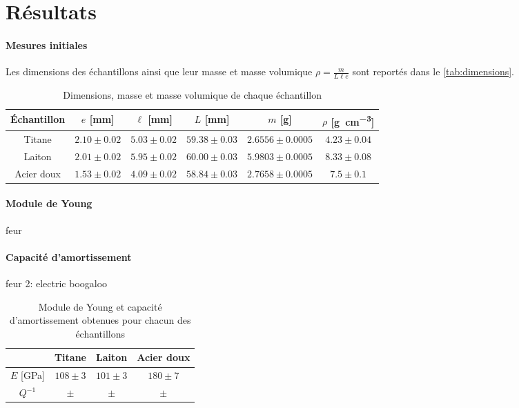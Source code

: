 \section{Résultats}

\paragraph{Mesures initiales} Les dimensions des échantillons ainsi que leur masse et masse volumique \(\rho = \frac{m}{L \ell e}\) sont reportés dans le \autoref{tab:dimensions}.

\begin{table}[h]
    \centering
    \begin{tabulary}{0.7\linewidth}{c|c c c c c}
        \toprule
        Échantillon & \(e\) [\si{\milli\meter}] & \(\ell\) [\si{\milli\meter}] & \(L\) [\si{\milli\meter}] & \(m\) [\si{\gram}] & \(\rho\) [\si{\gram\per\cubic\centi\meter}] \\
        \midrule
        Titane & \(2.10 \pm 0.02\) & \(5.03 \pm 0.02\) & \(59.38 \pm 0.03\) & \(2.6556 \pm 0.0005\) & \(4.23 \pm 0.04\) \\
        Laiton & \(2.01 \pm 0.02\) & \(5.95 \pm 0.02\) & \(60.00 \pm 0.03\) & \(5.9803 \pm 0.0005\) & \(8.33 \pm 0.08\) \\
        Acier doux & \(1.53 \pm 0.02\) & \(4.09 \pm 0.02\) & \(58.84 \pm 0.03\) & \(2.7658 \pm 0.0005\) & \(7.5 \pm 0.1\) \\
        \bottomrule
    \end{tabulary}
    \caption{Dimensions, masse et masse volumique de chaque échantillon}
    \label{tab:dimensions}
\end{table}

\paragraph{Module de Young} feur

\paragraph{Capacité d'amortissement} feur 2: electric boogaloo

\begin{table}[h]
    \centering
    \begin{tabulary}{0.7\linewidth}{c|C C C}
        \toprule
        & Titane & Laiton & Acier doux \\
        \midrule
        \(E\) [\si{\giga\pascal}] & \(108 \pm 3\) & \(101 \pm 3\) & \(180 \pm 7\) \\
        \(Q^{-1}\) & \(\pm\) & \(\pm\) & \(\pm\) \\
        \bottomrule
    \end{tabulary}
    \caption{Module de Young et capacité d'amortissement obtenues pour chacun des échantillons}
    \label{tab:young_amortissement}
\end{table}